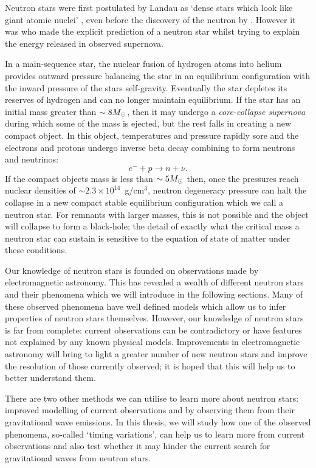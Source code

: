 \documentclass[../full_thesis/full_thesis.tex]{subfiles}
\begin{document}
 

Neutron stars were first postulated by Landau as `dense stars
which look like giant atomic nuclei' \citep{Yakovlev2013}, even before the
discovery of the neutron by \citet{Chadwick1932}. However it was
\citet{Baade1934} who made the explicit prediction of a neutron star whilst
trying to explain the energy released in observed supernova.

In a main-sequence star, the nuclear fusion of
hydrogen atoms into helium provides outward pressure balancing the star in an
equilibrium configuration with the inward pressure of the stars self-gravity.
Eventually the star depletes its reserves of hydrogen and can no longer
maintain equilibrium. If the star has an initial mass greater than $\sim 8
M_{\odot}$, then it may undergo a \emph{core-collapse supernova} during which some
of the mass is ejected, but the rest falls in creating a new compact object.
In this object, temperatures and pressure rapidly sore and the
electrons and protons undergo inverse beta decay combining to form neutrons and
neutrinos:
\begin{equation}
    e^{-} + p \rightarrow n + \nu.
\end{equation}
If the compact objects mass is less than $\sim 5 M_{\odot}$ then, once the pressures
reach nuclear densities of $\sim 2.3 \times10^{14}$~g/cm$^{3}$, neutron
degeneracy pressure can halt the collapse in a new compact stable equilibrium
configuration which we call a neutron star. For remnants with larger masses,
this is not possible and the object will collapse to form a black-hole; the
detail of exactly what the critical mass a neutron star can sustain is
sensitive to the equation of state of matter under these conditions.

Our knowledge of neutron stars is founded on observations made by
electromagnetic astronomy. This has revealed a wealth of different neutron
stars and their phenomena which we will introduce in the following sections.
Many of these observed phenomena have well defined models which allow us to
infer properties of neutron stars themselves.
However, our knowledge of neutron stars is far from complete: current
observations can be contradictory or have features not explained by any known
physical models. Improvements in electromagnetic astronomy will bring to light
a greater number of new neutron stars and improve the resolution of those
currently observed; it is hoped that this will help us to better understand them.

There are two other methods we can utilise to learn more about neutron stars: improved
modelling of current observations and by observing them from their
gravitational wave emissions. In this thesis, we will study how one of the
observed phenomena, so-called `timing variations', can help us to learn more
from current observations and also test whether it may hinder the current
search for gravitational waves from neutron stars.
\end{document}
